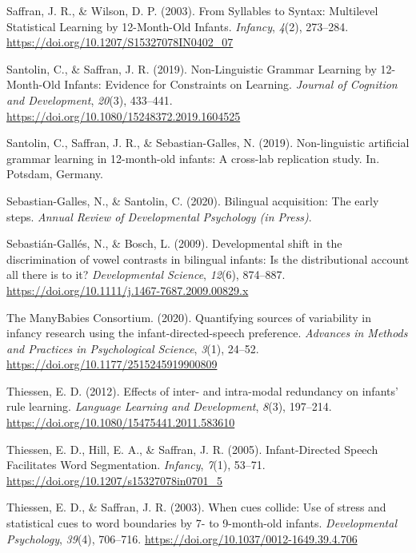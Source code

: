 \documentclass[
  english,
  man,man,floatsintext]{apa6}
\begin{document}
\leavevmode\hypertarget{ref-saffran2003}{}%
Saffran, J. R., \& Wilson, D. P. (2003). From Syllables to Syntax: Multilevel Statistical Learning by 12-Month-Old Infants. \emph{Infancy}, \emph{4}(2), 273--284. \url{https://doi.org/10.1207/S15327078IN0402_07}

\leavevmode\hypertarget{ref-santolin2019}{}%
Santolin, C., \& Saffran, J. R. (2019). Non-Linguistic Grammar Learning by 12-Month-Old Infants: Evidence for Constraints on Learning. \emph{Journal of Cognition and Development}, \emph{20}(3), 433--441. \url{https://doi.org/10.1080/15248372.2019.1604525}

\leavevmode\hypertarget{ref-santolin2019a}{}%
Santolin, C., Saffran, J. R., \& Sebastian-Galles, N. (2019). Non-linguistic artificial grammar learning in 12-month-old infants: A cross-lab replication study. In. Potsdam, Germany.

\leavevmode\hypertarget{ref-sebastian-galles2020}{}%
Sebastian-Galles, N., \& Santolin, C. (2020). Bilingual acquisition: The early steps. \emph{Annual Review of Developmental Psychology (in Press)}.

\leavevmode\hypertarget{ref-sebastian-galles2009}{}%
Sebastián-Gallés, N., \& Bosch, L. (2009). Developmental shift in the discrimination of vowel contrasts in bilingual infants: Is the distributional account all there is to it? \emph{Developmental Science}, \emph{12}(6), 874--887. \url{https://doi.org/10.1111/j.1467-7687.2009.00829.x}

\leavevmode\hypertarget{ref-many-babies2020}{}%
The ManyBabies Consortium. (2020). Quantifying sources of variability in infancy research using the infant-directed-speech preference. \emph{Advances in Methods and Practices in Psychological Science}, \emph{3}(1), 24--52. \url{https://doi.org/10.1177/2515245919900809}

\leavevmode\hypertarget{ref-thiessen2012}{}%
Thiessen, E. D. (2012). Effects of inter- and intra-modal redundancy on infants' rule learning. \emph{Language Learning and Development}, \emph{8}(3), 197--214. \url{https://doi.org/10.1080/15475441.2011.583610}

\leavevmode\hypertarget{ref-thiessen2005}{}%
Thiessen, E. D., Hill, E. A., \& Saffran, J. R. (2005). Infant-Directed Speech Facilitates Word Segmentation. \emph{Infancy}, \emph{7}(1), 53--71. \url{https://doi.org/10.1207/s15327078in0701_5}

\leavevmode\hypertarget{ref-thiessen2003}{}%
Thiessen, E. D., \& Saffran, J. R. (2003). When cues collide: Use of stress and statistical cues to word boundaries by 7- to 9-month-old infants. \emph{Developmental Psychology}, \emph{39}(4), 706--716. \url{https://doi.org/10.1037/0012-1649.39.4.706}
\end{document}
